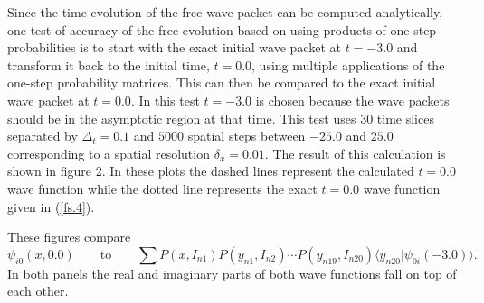 \documentclass[aps,prc,reprint,noshowpacs,groupedaddress,onecolumn]{revtex4}
\def\beq{\begin{equation}}
\def\eeq{\end{equation}}
\begin{document}
Since the time evolution of the free wave packet can be computed
analytically, one test of accuracy of the free evolution based on
using products of one-step probabilities is to start with the exact
initial wave packet at $t=-3.0$ and transform it back to the initial
time, $t=0.0$, using multiple applications of the one-step probability
matrices.  This can then be compared to
the exact initial wave packet at $t=0.0$.  In this test $t=-3.0$ is chosen
because the wave packets should be in the asymptotic region
at that time.  This test uses 30 time slices separated by $\Delta_t=0.1$ and
$5000$ spatial steps between $-25.0$ and $25.0$ corresponding to a spatial
resolution $\delta_x=0.01$.  The result of this calculation is
shown in figure 2.  In these plots the dashed lines
represent the calculated $t=0.0$ wave function while the dotted line
represents the exact $t=0.0$ wave function given in (\ref{fs.4}).

These figures compare
\beq
\psi_{i0}(x,0.0) 
\qquad \mbox{to} \qquad
\sum P(x,I_{n1}) P(y_{n1},I_{n2}) \cdots
P(y_{n19 },I_{n20})\langle y_{n20} \vert \psi_{0i}(-3.0) \rangle .
\label{cc.2}
\eeq
In both panels the real and imaginary parts of both wave
functions fall on top of each other.  
\end{document}
